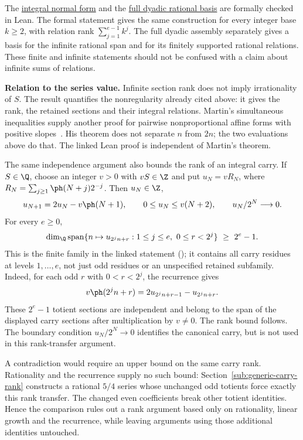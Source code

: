 The \href{https://github.com/wcook04/plectis-erdos/blob/25ef6245d15a47548c6926369ae8f1a0f0a14a80/ErdosProblems/Erdos249/PaperCompleteR8/KernelRelationBasis.lean#L398}{integral normal form} and the \href{https://github.com/wcook04/plectis-erdos/blob/25ef6245d15a47548c6926369ae8f1a0f0a14a80/ErdosProblems/Erdos249/PaperCompleteR8/FullKernelAssemblies.lean#L156}{full dyadic rational basis} are formally checked in Lean.
The formal statement gives the same construction for every integer base
$k\ge2$, with relation rank $\sum_{j=1}^{e-1}k^j$.  The full dyadic
assembly separately gives a basis for the infinite rational span and for
its finitely supported rational relations.  These finite and infinite
statements should not be confused with a claim about infinite sums of
relations.

\textbf{Relation to the series value.}
Infinite section rank does not imply irrationality of $S$. The result
quantifies the nonregularity already cited above: it gives the rank,
the retained sections and their integral relations. Martin's simultaneous
inequalities supply another proof for pairwise nonproportional affine
forms with positive slopes~\cite[Theorem~1]{martin-phi-inequalities}.
His theorem does not separate $n$ from $2n$; the two
evaluations above do that. The linked Lean proof is independent of
Martin's theorem.

The same independence argument also bounds the rank of an integral carry.
If $S\in\Q$, choose an integer $v>0$ with $vS\in\Z$ and put $u_N=vR_N$,
where $R_N=\sum_{j\ge1}\ph(N+j)2^{-j}$. Then $u_N\in\Z$,
\[
 u_{N+1}=2u_N-v\ph(N+1),\qquad
 0\le u_N\le v(N+2),\qquad u_N/2^N\longrightarrow0.
\]
For every $e\ge0$,
\[
 \dim_{\Q}\operatorname{span}
 \{n\mapsto u_{2^j n+r}:1\le j\le e,\ 0\le r<2^j\}
 \ \ge\ 2^e-1.
\]
This is the finite family in the linked statement
();
it contains all carry residues at levels $1,\ldots,e$, not just odd
residues or an unspecified retained subfamily. Indeed, for each odd
$r$ with $0<r<2^j$, the recurrence gives
\[
 v\ph(2^j n+r)=2u_{2^j n+r-1}-u_{2^j n+r}.
\]
These $2^e-1$ totient sections are independent and belong to the span
of the displayed carry sections after multiplication by $v\ne0$.
The rank bound follows. The boundary condition $u_N/2^N\to0$ identifies
the canonical carry, but is not used in this rank-transfer argument.

A contradiction would require an upper bound on the same carry
rank. Rationality and the recurrence supply no such bound:
Section~\ref{sub:generic-carry-rank} constructs a rational $5/4$
series whose unchanged odd totients force exactly this rank transfer.
The changed even coefficients break other totient identities. Hence
the comparison rules out a rank argument based only on rationality,
linear growth and the recurrence, while leaving arguments using
those additional identities untouched.

